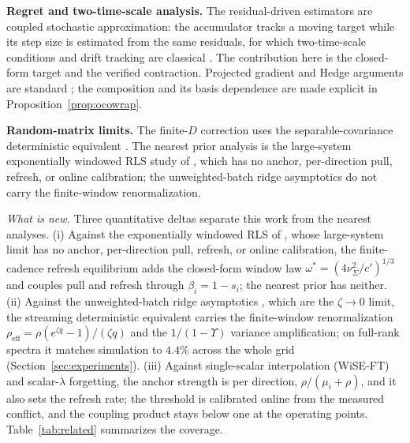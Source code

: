 \documentclass[10pt]{article}
\begin{document}
\textbf{Regret and two-time-scale analysis.}
The residual-driven estimators are coupled stochastic approximation: the accumulator tracks a moving target while its step size is estimated from the same residuals, for which two-time-scale conditions and drift tracking are classical \citep{benveniste1990,kushner2003,borkar2008}.
The contribution here is the closed-form target and the verified contraction.
Projected gradient and Hedge arguments are standard \citep{zinkevich2003}; the composition and its basis dependence are made explicit in Proposition~\ref{prop:ocowrap}.

\textbf{Random-matrix limits.}
The finite-\(D\) correction uses the separable-covariance deterministic equivalent \citep{silverstein1995,rubio2011,hachem2007}.
The nearest prior analysis is the large-system exponentially windowed RLS study of \citet{xiao2005}, which has no anchor, per-direction pull, refresh, or online calibration; the unweighted-batch ridge asymptotics \citep{hastie2022,pafka2004} do not carry the finite-window renormalization.

\emph{What is new.}
Three quantitative deltas separate this work from the nearest analyses.
(i) Against the exponentially windowed RLS of \citet{xiao2005}, whose large-system limit has no anchor, per-direction pull, refresh, or online calibration, the finite-cadence refresh equilibrium adds the closed-form window law $\omega^*=(4\nu^2_\Sigma/c')^{1/3}$ and couples pull and refresh through $\beta_i=1-s_i$; the nearest prior has neither.
(ii) Against the unweighted-batch ridge asymptotics \citep{hastie2022,pafka2004,silverstein1995,rubio2011,hachem2007}, which are the $\zeta\to0$ limit, the streaming deterministic equivalent carries the finite-window renormalization $\rho_{\mathrm{eff}}=\rho(e^{\zeta q}-1)/(\zeta q)$ and the $1/(1-\Upsilon)$ variance amplification; on full-rank spectra it matches simulation to $4.4\%$ across the whole grid (Section~\ref{sec:experiments}).
(iii) Against single-scalar interpolation (WiSE-FT) and scalar-$\lambda$ forgetting, the anchor strength is per direction, $\rho/(\mu_i+\rho)$, and it also sets the refresh rate; the threshold is calibrated online from the measured conflict, and the coupling product stays below one at the operating points.
Table~\ref{tab:related} summarizes the coverage.
\end{document}
